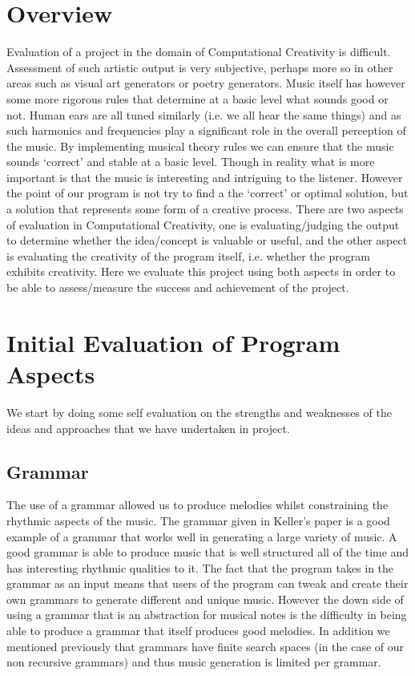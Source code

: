 \documentclass[pdftex,12pt,a4paper]{report}
\begin{document}
\section{Overview}
Evaluation of a project in the domain of Computational Creativity is difficult. Assessment of such artistic output is very subjective, perhaps more so in other areas such as visual art generators or poetry generators. Music itself has however some more rigorous rules that determine at a basic level what sounds good or not. Human ears are all tuned similarly (i.e. we all hear the same things) and as such harmonics and frequencies play a significant role in the overall perception of the music. By implementing musical theory rules we can ensure that the music sounds `correct' and stable at a basic level. Though in reality what is more important is that the music is interesting and intriguing to the listener. 
However the point of our program is not try to find a the `correct' or optimal solution, but a solution that represents some form of a creative process.
There are two aspects of evaluation in Computational Creativity, one is evaluating/judging the output to determine whether the idea/concept is valuable or useful, and the other aspect is evaluating the creativity of the program itself, i.e. whether the program exhibits creativity. Here we evaluate this project using both aspects in order to be able to assess/measure the success and achievement of the project.

\section{Initial Evaluation of Program Aspects}
We start by doing some self evaluation on the strengths and weaknesses of the ideas and approaches that we have undertaken in project.

\subsection{Grammar}
The use of a grammar allowed us to produce melodies whilst constraining the rhythmic aspects of the music. The grammar given in Keller's paper \cite{keller07} is a good example of a grammar that works well in generating a large variety of music. A good grammar is able to produce music that is well structured all of the time and has interesting rhythmic qualities to it. The fact that the program takes in the grammar as an input means that users of the program can tweak and create their own grammars to generate different and unique music. However the down side of using a grammar that is an abstraction for musical notes is the difficulty in being able to produce a grammar that itself produces good melodies. In addition we mentioned previously that grammars have finite search spaces (in the case of our non recursive grammars) and thus music generation is limited per grammar.
\end{document}
